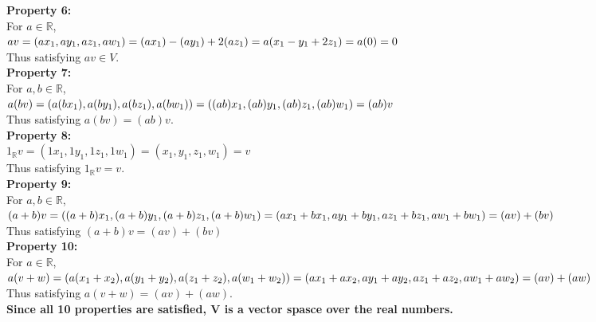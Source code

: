 \documentclass{article}
\begin{document}
\begin{enumerate}
\begin{enumerate}
\textbf{Property 6:} \\ For $a \in \mathbb{R}$, \\ $a v = (a x_1, a y_1, a z_1, a w_1) \\ = (a x_1) - (a y_1) + 2(a z_1) = a (x_1 - y_1 + 2z_1) = a (0) = 0$ \\
Thus satisfying $a v \in V$. \\
\textbf{Property 7:} \\ For $a,b \in \mathbb{R}$, \\ $a(bv) = (a(bx_1), a(by_1), a(bz_1), a(bw_1)) \\ = ((ab)x_1, (ab)y_1, (ab)z_1, (ab)w_1) = (ab)v$ \\ Thus satisfying $a(bv) = (ab)v$. \\
\textbf{Property 8:} \\ $1_{\mathbb{R}} v = (1x_1, 1y_1,1z_1,1w_1) = (x_1,y_1,z_1,w_1) = v$ \\Thus satisfying $1_{\mathbb{R}} v = v$. \\
\textbf{Property 9:} \\ For $a,b \in \mathbb{R}$, \\ $(a + b) v = ((a + b) x_1, (a + b) y_1, (a + b) z_1, (a + b) w_1) \\
= (ax_1 + bx_1, ay_1 + by_1, az_1 + bz_1, aw_1 + bw_1) = (av) + (bv)$ \\ Thus satisfying $(a + b)v = (av) + (bv)$ \\
\textbf{Property 10:} \\ For $a \in \mathbb{R}$, \\ $a(v + w) = (a(x_1 + x_2), a(y_1 + y_2), a(z_1 + z_2), a(w_1 + w_2)) \\
=(ax_1 + ax_2, ay_1 + ay_2, az_1 + az_2, aw_1 + aw_2) = (av) + (aw)$ \\ Thus satisfying $a(v + w) = (av) + (aw)$.\\
\textbf{Since all 10 properties are satisfied, V is a vector spasce over the real numbers.}


\end{enumerate}
\end{enumerate}
\end{document}
